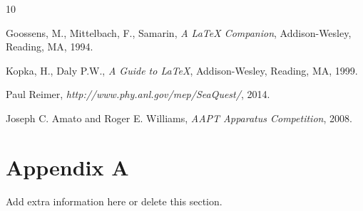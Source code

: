 \documentclass[DIV=calc, paper=a4, fontsize=11pt, twocolumn]{scrartcl}	 %
\begin{document}
\begin{thebibliography}{10} %

 Goossens, M., Mittelbach, F., Samarin, \emph{A LaTeX
Companion}, Addison-Wesley, Reading, MA, 1994.

 Kopka, H., Daly P.W., \emph{A Guide to LaTeX},
Addison-Wesley, Reading, MA, 1999.

 Paul Reimer, \emph{http://www.phy.anl.gov/mep/SeaQuest/}, 2014. 

 Joseph C. Amato and Roger E. Williams, \emph{AAPT Apparatus Competition}, 2008. 

\end{thebibliography}


\newpage 


\section*{Appendix A}

Add extra information here or delete this section.
\end{document}
